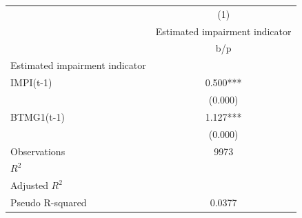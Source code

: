 {
\def\sym#1{\ifmmode^{#1}\else\(^{#1}\)\fi}
\begin{tabular}{l*{1}{c}}
\hline\hline
                    &\multicolumn{1}{c}{(1)}\\
                    &\multicolumn{1}{c}{Estimated impairment indicator}\\
                    &         b/p   \\
\hline
Estimated impairment indicator&               \\
IMPI(t-1)           &       0.500***\\
                    &     (0.000)   \\
BTMG1(t-1)          &       1.127***\\
                    &     (0.000)   \\
\hline
Observations        &        9973   \\
\(R^{2}\)           &               \\
Adjusted \(R^{2}\)  &               \\
Pseudo R-squared    &      0.0377   \\
\hline\hline
\end{tabular}
}
